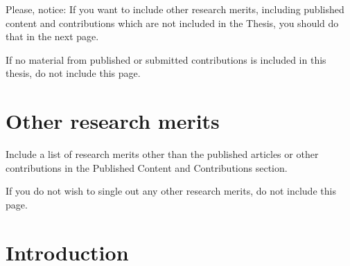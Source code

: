\documentclass[12pt]{report} %
\begin{document}
Please, notice:  If you want to include other research merits, including published content and contributions which are not included in the Thesis, you should do that in the next page.

If no material from published or submitted contributions is included in this thesis, do not include this page.

\chapter*{Other research merits}
\thispagestyle{empty}
Include a list of research merits other than the published articles or other contributions in the Published Content and Contributions section.

If you do not wish to single out any other research merits, do not include this page.


\tableofcontents
\thispagestyle{fancy}

\listoffigures
\thispagestyle{fancy}

\listoftables
\thispagestyle{fancy}

\clearpage
{} %

\chapter{Introduction}




\clearpage
{}

\printbibliography




\end{document}
